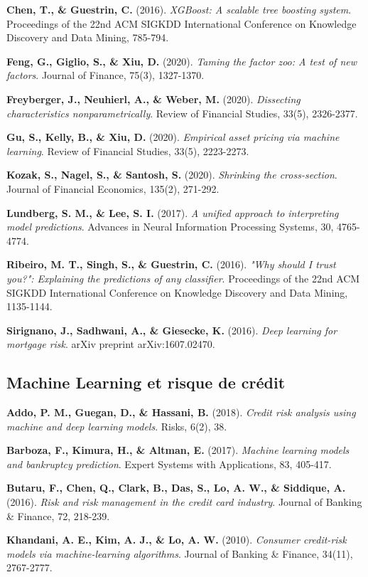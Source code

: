 \textbf{Chen, T., \& Guestrin, C.} (2016). \textit{XGBoost: A scalable tree boosting system}. Proceedings of the 22nd ACM SIGKDD International Conference on Knowledge Discovery and Data Mining, 785-794.

\textbf{Feng, G., Giglio, S., \& Xiu, D.} (2020). \textit{Taming the factor zoo: A test of new factors}. Journal of Finance, 75(3), 1327-1370.

\textbf{Freyberger, J., Neuhierl, A., \& Weber, M.} (2020). \textit{Dissecting characteristics nonparametrically}. Review of Financial Studies, 33(5), 2326-2377.

\textbf{Gu, S., Kelly, B., \& Xiu, D.} (2020). \textit{Empirical asset pricing via machine learning}. Review of Financial Studies, 33(5), 2223-2273.

\textbf{Kozak, S., Nagel, S., \& Santosh, S.} (2020). \textit{Shrinking the cross-section}. Journal of Financial Economics, 135(2), 271-292.

\textbf{Lundberg, S. M., \& Lee, S. I.} (2017). \textit{A unified approach to interpreting model predictions}. Advances in Neural Information Processing Systems, 30, 4765-4774.

\textbf{Ribeiro, M. T., Singh, S., \& Guestrin, C.} (2016). \textit{"Why should I trust you?": Explaining the predictions of any classifier}. Proceedings of the 22nd ACM SIGKDD International Conference on Knowledge Discovery and Data Mining, 1135-1144.

\textbf{Sirignano, J., Sadhwani, A., \& Giesecke, K.} (2016). \textit{Deep learning for mortgage risk}. arXiv preprint arXiv:1607.02470.

\subsection{Machine Learning et risque de crédit}

\textbf{Addo, P. M., Guegan, D., \& Hassani, B.} (2018). \textit{Credit risk analysis using machine and deep learning models}. Risks, 6(2), 38.

\textbf{Barboza, F., Kimura, H., \& Altman, E.} (2017). \textit{Machine learning models and bankruptcy prediction}. Expert Systems with Applications, 83, 405-417.

\textbf{Butaru, F., Chen, Q., Clark, B., Das, S., Lo, A. W., \& Siddique, A.} (2016). \textit{Risk and risk management in the credit card industry}. Journal of Banking \& Finance, 72, 218-239.

\textbf{Khandani, A. E., Kim, A. J., \& Lo, A. W.} (2010). \textit{Consumer credit-risk models via machine-learning algorithms}. Journal of Banking \& Finance, 34(11), 2767-2777.

